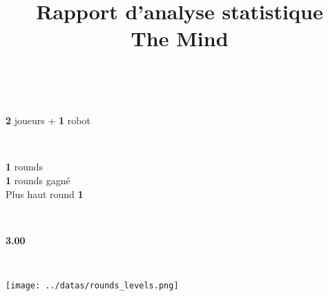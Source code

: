 \documentclass[a4paper,11pt,landscape]{article}
\title{\vspace{-1cm}\Huge \textbf{Rapport d'analyse statistique} \\ \Large The Mind\vspace{-1cm}}
\date{}
\begin{document}
\color{white}
\maketitle
\begin{multicols}{2} %
    \noindent
    \begin{tcolorbox}[colback=ora2,colframe=ora2]
        \begin{tcolorbox}[colback=ora1,colframe=ora1]
            \centering \textcolor{white}{\textbf{Nombre de joueurs}}
        \end{tcolorbox}
    \centering \textbf{
2
    } joueurs + \textbf{
    1
    } robot

    \begin{tcolorbox}[colback=ora1,colframe=ora1]
        \centering \textcolor{white}{\textbf{Rounds}}
    \end{tcolorbox}
        \centering \textbf{
1
        } rounds \\
        \centering \textbf{
1
        } rounds gagné \\
        \centering Plus haut round \textbf{
1
        }

    \begin{tcolorbox}[colback=ora1,colframe=ora1]
        \centering \textcolor{white}{\textbf{Reaction time moyen}}
    \end{tcolorbox}
     \centering \textbf{
3.00
        }

    \end{tcolorbox}

    \vfill

    \noindent
    \begin{tcolorbox}[colback=ora2,colframe=ora2]
        \begin{tcolorbox}[colback=ora1,colframe=ora1]
            \centering \textcolor{white}{\textbf{Niveau des rounds}}
        \end{tcolorbox}
            \centering \texttt{[image: ../datas/rounds\_levels.png]}


    \end{tcolorbox}
    \vfill
\end{multicols}
\end{document}
